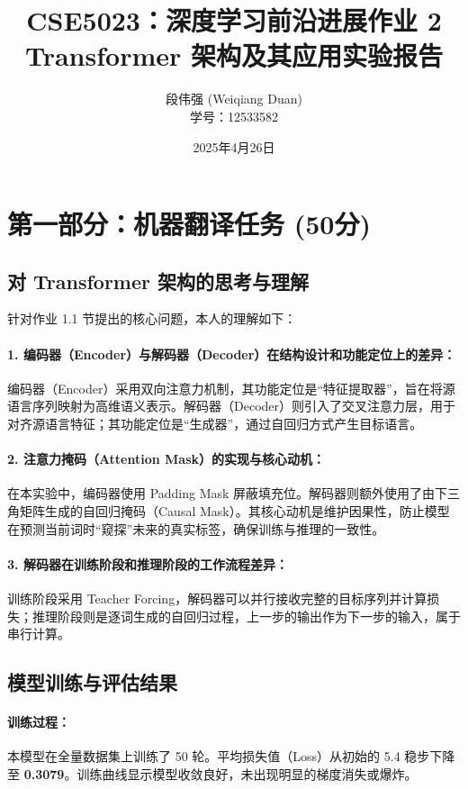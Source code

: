 \documentclass[11pt,a4paper]{article}
\title{CSE5023：深度学习前沿进展作业 2\\ Transformer 架构及其应用实验报告}
\author{段伟强 (Weiqiang Duan) \\ 学号：12533582}
\date{2025年4月26日}
\begin{document}
\maketitle

\section{第一部分：机器翻译任务 (50分)}

\subsection{对 Transformer 架构的思考与理解}

针对作业 1.1 节提出的核心问题，本人的理解如下：

\paragraph{1. 编码器（Encoder）与解码器（Decoder）在结构设计和功能定位上的差异：}
编码器（Encoder）采用双向注意力机制，其功能定位是“特征提取器”，旨在将源语言序列映射为高维语义表示。解码器（Decoder）则引入了交叉注意力层，用于对齐源语言特征；其功能定位是“生成器”，通过自回归方式产生目标语言。

\paragraph{2. 注意力掩码（Attention Mask）的实现与核心动机：}
在本实验中，编码器使用 Padding Mask 屏蔽填充位。解码器则额外使用了由下三角矩阵生成的自回归掩码（Causal Mask）。其核心动机是维护因果性，防止模型在预测当前词时“窥探”未来的真实标签，确保训练与推理的一致性。

\paragraph{3. 解码器在训练阶段和推理阶段的工作流程差异：}
训练阶段采用 Teacher Forcing，解码器可以并行接收完整的目标序列并计算损失；推理阶段则是逐词生成的自回归过程，上一步的输出作为下一步的输入，属于串行计算。

\subsection{模型训练与评估结果}

\paragraph{训练过程：} 本模型在全量数据集上训练了 50 轮。平均损失值（Loss）从初始的 5.4 稳步下降至 \textbf{0.3079}。训练曲线显示模型收敛良好，未出现明显的梯度消失或爆炸。
\end{document}
